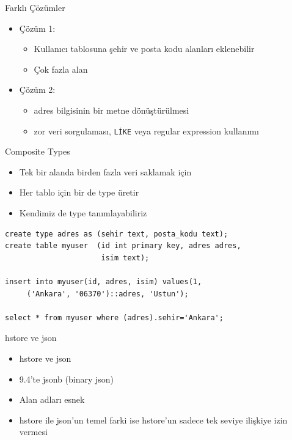 \documentclass[presentation]{beamer}
\begin{document}
\begin{frame}[fragile,label=sec-23]{Farklı Çözümler}
 \begin{itemize}
\item Çözüm 1:
\begin{itemize}
\item Kullanıcı tablosuna şehir ve posta kodu alanları eklenebilir
\item Çok fazla alan
\end{itemize}
\item Çözüm 2:
\begin{itemize}
\item adres bilgisinin bir metne dönüştürülmesi
\item zor veri sorgulaması, \texttt{LİKE} veya regular expression kullanımı
\end{itemize}
\end{itemize}
\end{frame}

\begin{frame}[fragile,label=sec-24]{Composite Types}
 \begin{itemize}
\item Tek bir alanda birden fazla veri saklamak için
\item Her tablo için bir de type üretir
\item Kendimiz de type tanımlayabiliriz
\end{itemize}

\begin{verbatim}
create type adres as (sehir text, posta_kodu text);
create table myuser  (id int primary key, adres adres,
                      isim text);

insert into myuser(id, adres, isim) values(1,
     ('Ankara', '06370')::adres, 'Ustun');

select * from myuser where (adres).sehir='Ankara';
\end{verbatim}
\end{frame}

\begin{frame}[label=sec-25]{hstore ve json}
\begin{itemize}
\item hstore ve json
\item 9.4'te jsonb (binary json)
\item Alan adları esnek
\item hstore ile json'un temel farki ise hstore'un sadece tek seviye ilişkiye izin
vermesi
\end{itemize}
\end{frame}
\end{document}
